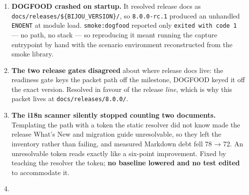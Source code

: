 \begin{enumerate}
\def\labelenumi{\arabic{enumi}.}
\item
  \textbf{DOGFOOD crashed on startup.} It resolved release docs as \texttt{d\allowbreak{}o\allowbreak{}c\allowbreak{}s\allowbreak{}/\allowbreak{}r\allowbreak{}e\allowbreak{}l\allowbreak{}e\allowbreak{}a\allowbreak{}s\allowbreak{}e\allowbreak{}s\allowbreak{}/\allowbreak{}\$\allowbreak{}\{\allowbreak{}B\allowbreak{}I\allowbreak{}J\allowbreak{}O\allowbreak{}U\allowbreak{}\_\allowbreak{}V\allowbreak{}E\allowbreak{}R\allowbreak{}S\allowbreak{}I\allowbreak{}O\allowbreak{}N\allowbreak{}\}\allowbreak{}/}, so \texttt{8\allowbreak{}.\allowbreak{}0\allowbreak{}.\allowbreak{}0\allowbreak{}-\allowbreak{}r\allowbreak{}c\allowbreak{}.\allowbreak{}1} produced an unhandled \texttt{E\allowbreak{}N\allowbreak{}O\allowbreak{}E\allowbreak{}N\allowbreak{}T} at module load. \texttt{s\allowbreak{}m\allowbreak{}o\allowbreak{}k\allowbreak{}e\allowbreak{}:\allowbreak{}d\allowbreak{}o\allowbreak{}g\allowbreak{}f\allowbreak{}o\allowbreak{}o\allowbreak{}d} reported only \texttt{e\allowbreak{}x\allowbreak{}i\allowbreak{}t\allowbreak{}e\allowbreak{}d\allowbreak{} \allowbreak{}w\allowbreak{}i\allowbreak{}t\allowbreak{}h\allowbreak{} \allowbreak{}c\allowbreak{}o\allowbreak{}d\allowbreak{}e\allowbreak{} \allowbreak{}1} --- no path, no stack --- so reproducing it meant running the capture entrypoint by hand with the scenario environment reconstructed from the smoke library.
\item
  \textbf{The two release gates disagreed} about where release docs live: the readiness gate keys the packet path off the milestone, DOGFOOD keyed it off the exact version. Resolved in favour of the release \emph{line}, which is why this packet lives at \texttt{d\allowbreak{}o\allowbreak{}c\allowbreak{}s\allowbreak{}/\allowbreak{}r\allowbreak{}e\allowbreak{}l\allowbreak{}e\allowbreak{}a\allowbreak{}s\allowbreak{}e\allowbreak{}s\allowbreak{}/\allowbreak{}8\allowbreak{}.\allowbreak{}0\allowbreak{}.\allowbreak{}0\allowbreak{}/}.
\item
  \textbf{The i18n scanner silently stopped counting two documents.} Templating the path with a token the static resolver did not know made the release What's New and migration guide unresolvable, so they left the inventory rather than failing, and measured Markdown debt fell 78 → 72. An unresolvable token reads exactly like a six-point improvement. Fixed by teaching the resolver the token; \textbf{no baseline lowered and no test edited} to accommodate it.
\item

\end{enumerate}
